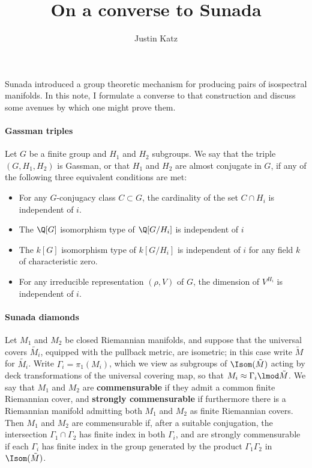 \documentclass{article}
\title{On a converse to Sunada}
\author{Justin Katz}
\begin{document}
\maketitle 

 
Sunada introduced a group theoretic mechanism for producing pairs of isospectral manifolds. In this note, I formulate a converse to that construction and discuss some avenues by which one might prove them.

\paragraph{Gassman triples}
Let $G$ be a finite group and $H_{1}$ and $H_{2}$ subgroups. We say that the triple $(G,H_{1},H_{2})$ is Gassman, or that $H_{1}$ and $H_{2}$ are almost conjugate in $G$, if any of the following three equivalent conditions are met:
\begin{itemize}
	\item For any  $G$-conjugacy class $C \subset G$,  the cardinality of the set $C\cap H_{i}$ is independent of $i$.\
	\item The $\Q[G]$ isomorphism type of $\Q[G/H_{i}]$ is independent of $i$
	\item The $k[G]$ isomorphism type of $k[G/H_{i}]$ is independent of $i$ for any field $k$ of characteristic zero.
	\item For any irreducible representation $(\rho,V)$ of $G$, the dimension of $V^{H_{i}}$ is independent of $i$. 
\end{itemize}

\paragraph{Sunada diamonds}
Let $M_{1}$ and $M_{2}$ be closed Riemannian manifolds, and suppose that the universal covers $\tilde{M_{i}}$, equipped with the pullback metric, are isometric; in this case write $\tilde{M}$ for $\tilde{M_{i}}$.   Write $\Gamma_{i} = \pi_{1}(M_{i})$, which we view as subgroups of $\Isom(\tilde{M})$ acting by deck transformations of the universal covering map, so that $M_{i} \approx \Gamma_{i} \lmod \tilde{M}$. We say that $M_{1}$ and $M_{2}$ are \textbf{commensurable} if they admit a common finite Riemannian cover, and \textbf{strongly commensurable} if furthermore there is a Riemannian manifold admitting both $M_1$ and $M_2$ as finite Riemannian covers.  Then $M_1$ and $M_2$ are commensurable if, after a suitable conjugation, the intersection $\Gamma_1\cap \Gamma_2$ has finite index in both $\Gamma_i$, and are strongly commensurable if each $\Gamma_i$ has finite index in the group generated by the product $\Gamma_1\Gamma_2$ in $\Isom(\tilde{M})$. 
\end{document}
